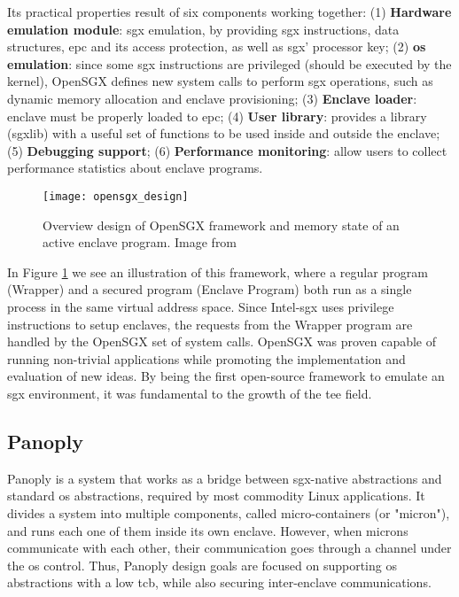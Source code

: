 Its practical properties result of six components working together: 
(1) \textbf{Hardware emulation module}: \gls{sgx} emulation, by providing \gls{sgx} instructions, data structures, \gls{epc} and its access protection, as well as \gls{sgx}' processor key; 
(2) \textbf{\gls{os} emulation}: since some \gls{sgx} instructions are privileged (should be executed by the kernel), OpenSGX defines new system calls to perform \gls{sgx} operations, such as dynamic memory allocation and enclave provisioning; 
(3) \textbf{Enclave loader}: enclave must be properly loaded to \gls{epc}; 
(4) \textbf{User library}: provides a library (sgxlib) with a useful set of functions to be used inside and outside the enclave; 
(5) \textbf{Debugging support}; 
(6) \textbf{Performance monitoring}: allow users to collect performance statistics about enclave programs.

\begin{figure}[htbp]
	\centering
	{\texttt{[image: opensgx\_design]}}
	\caption{Overview design of OpenSGX framework and memory state of an active enclave program. Image from \cite{opensgx_paper}}
	\label{fig:openSGXDesign}
\end{figure}

In Figure \ref{fig:openSGXDesign} we see an illustration of this framework, where a regular program (Wrapper) and a secured program (Enclave Program) both run as a single process in the same virtual address space. Since Intel-\gls{sgx} uses privilege instructions to setup enclaves, the requests from the Wrapper program are handled by the OpenSGX set of system calls.
OpenSGX was proven capable of running non-trivial applications while promoting the implementation and evaluation of new ideas. By being the first open-source framework to emulate an \gls{sgx} environment, it was  fundamental to the growth of the \gls{tee} field.


\subsection{Panoply}
\label{ssec:panoply}

Panoply \cite{panoplyPaper} is a system that works as a bridge between \gls{sgx}-native abstractions and standard \gls{os} abstractions, required by most commodity Linux applications. 
It divides a system into multiple components, called micro-containers (or "micron"), and runs each one of them inside its own enclave. 
However, when microns communicate with each other, their communication goes through a channel under the \gls{os} control. Thus, Panoply design goals are focused on supporting \gls{os} abstractions with a low \gls{tcb}, while also securing inter-enclave communications.

